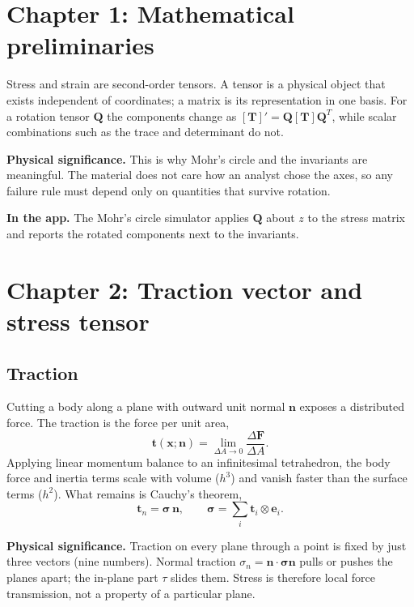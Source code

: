 \documentclass[11pt,a4paper]{article}
\newcommand{\tens}[1]{\bm{#1}}
\newcommand{\app}[1]{\par\smallskip\noindent\textbf{In the app.} #1}
\newcommand{\sig}[1]{\par\smallskip\noindent\textbf{Physical significance.} #1}
\begin{document}
\section{Chapter 1: Mathematical preliminaries}
Stress and strain are second-order tensors. A tensor is a physical object that exists independent of coordinates; a matrix is its representation in one basis. For a rotation tensor $\tens{Q}$ the components change as $[\tens{T}]' = \tens{Q}[\tens{T}]\tens{Q}^{T}$, while scalar combinations such as the trace and determinant do not.

\sig{This is why Mohr's circle and the invariants are meaningful. The material does not care how an analyst chose the axes, so any failure rule must depend only on quantities that survive rotation.}
\app{The Mohr's circle simulator applies $\tens{Q}$ about $z$ to the stress matrix and reports the rotated components next to the invariants.}

\section{Chapter 2: Traction vector and stress tensor}
\subsection{Traction}
Cutting a body along a plane with outward unit normal $\tens{n}$ exposes a distributed force. The traction is the force per unit area,
\begin{equation}
\tens{t}(\tens{x};\tens{n}) = \lim_{\Delta A\to 0}\frac{\Delta\tens{F}}{\Delta A}.
\end{equation}
Applying linear momentum balance to an infinitesimal tetrahedron, the body force and inertia terms scale with volume ($h^3$) and vanish faster than the surface terms ($h^2$). What remains is Cauchy's theorem,
\begin{equation}
\tens{t}_n = \tens{\sigma}\,\tens{n},\qquad
\tens{\sigma}=\sum_{i}\tens{t}_i\otimes\tens{e}_i .
\end{equation}
\sig{Traction on every plane through a point is fixed by just three vectors (nine numbers). Normal traction $\sigma_n=\tens{n}\cdot\tens{\sigma}\tens{n}$ pulls or pushes the planes apart; the in-plane part $\tau$ slides them. Stress is therefore local force transmission, not a property of a particular plane.}
\end{document}
